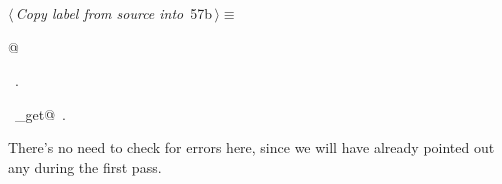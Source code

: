 \documentclass[a4paper]{report}
\begin{document}
\begin{flushleft} \small
\begin{minipage}{\linewidth}\label{scrap110}\raggedright\small
{} $\langle\,${\it Copy label from source into}\nobreak\ {\footnotesize {57b}}$\,\rangle\equiv$
\vspace{-1ex}
\begin{list}{}{} \item
\mbox{}@{\NWsep}
\end{list}
\vspace{-1.5ex}
\footnotesize
\begin{list}{}{\setlength{\itemsep}{-\parsep}\setlength{\itemindent}{-\leftmargin}}
\item \NWtxtMacroRefIn\ .
\item \NWtxtIdentsUsed\nobreak\  \verb@source_get@\nobreak\ .
\item{}
\end{list}
\end{minipage}\vspace{4ex}
\end{flushleft}
There's no need to check for errors here, since we will have already
pointed out any during the first pass.
\end{document}
